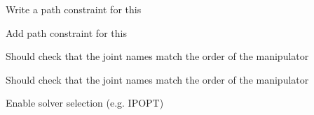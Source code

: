 \begin{DoxyRefList}
\label{todo__todo000040}%
%
Write a path constraint for this 

\label{todo__todo000041}%
%
Add path constraint for this 

\label{todo__todo000042}%
%
Should check that the joint names match the order of the manipulator 

\label{todo__todo000043}%
%
Should check that the joint names match the order of the manipulator  
\item[Member \mbox{\hyperlink{classtesseract__planning_1_1TrajOptIfoptMotionPlanner_aa86732e70ee5102815d15b896927e14d}{tesseract\+\_\+planning\+::Traj\+Opt\+Ifopt\+Motion\+Planner\+::solve}} (const \mbox{\hyperlink{structtesseract__planning_1_1PlannerRequest}{Planner\+Request}} \&request, \mbox{\hyperlink{structtesseract__planning_1_1PlannerResponse}{Planner\+Response}} \&response, bool verbose=false) const override]\label{todo__todo000044}%
%
Enable solver selection (e.\+g. I\+P\+O\+PT) 


\end{DoxyRefList}
